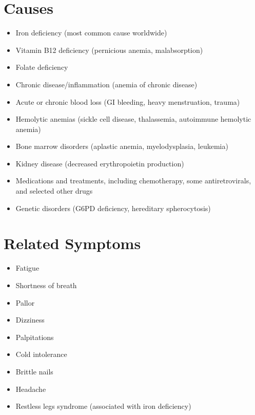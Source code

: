 \section*{Causes}
\begin{itemize}
\item Iron deficiency (most common cause worldwide)
\item Vitamin B12 deficiency (pernicious anemia, malabsorption)
\item Folate deficiency
\item Chronic disease/inflammation (anemia of chronic disease)
\item Acute or chronic blood loss (GI bleeding, heavy menstruation, trauma)
\item Hemolytic anemias (sickle cell disease, thalassemia, autoimmune hemolytic anemia)
\item Bone marrow disorders (aplastic anemia, myelodysplasia, leukemia)
\item Kidney disease (decreased erythropoietin production)
\item Medications and treatments, including chemotherapy, some antiretrovirals, and selected other drugs
\item Genetic disorders (G6PD deficiency, hereditary spherocytosis)
\end{itemize}

\section*{Related Symptoms}
\begin{itemize}
\item Fatigue
\item Shortness of breath
\item Pallor
\item Dizziness
\item Palpitations
\item Cold intolerance
\item Brittle nails
\item Headache
\item Restless legs syndrome (associated with iron deficiency)
\end{itemize}

